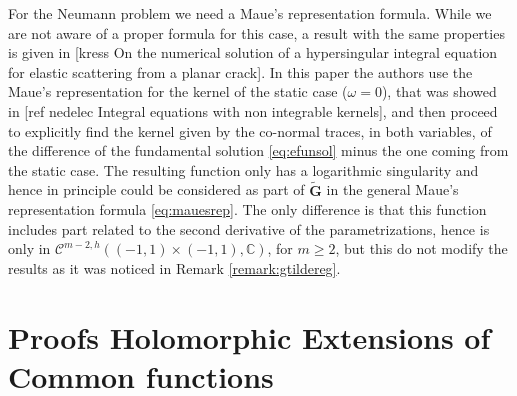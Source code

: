 \documentclass{article}
\newcommand{\todo}[1]{{\color{red}[#1]}}
\newcommand{\IC}{{\mathbb C}}
\newcommand{\cmspaceh}[4]{\mathcal{C}^{#1,#2} \left( #3, #4 \right)}
\newcommand{\iinterv}{(-1,1)\times(-1,1)}
\begin{document}
For the Neumann problem we need a Maue's representation formula. While we are not aware of a proper formula for this case, a result with the same properties is given in \todo{kress On the numerical solution of a hypersingular integral equation for elastic scattering from a planar crack}. In this paper the authors use the Maue's representation for the kernel of the static case ($\omega = 0$), that was showed in \todo{ref nedelec Integral equations with non integrable kernels}, and then proceed to explicitly find the kernel given by the co-normal traces, in both variables, of the difference of the fundamental solution \eqref{eq:efunsol}  minus the one coming from the static case. The resulting function only has a logarithmic singularity and hence in principle could be considered as part of $\widetilde{\mathbf{G}}$ in the general Maue's representation formula \eqref{eq:mauesrep}. The only difference is that this function includes part related to the second derivative of the parametrizations, hence is only in $\cmspaceh{m-2}{h}{\iinterv}{\IC}$, for $m\geq 2$, but this do not modify the results as it was noticed in Remark \ref{remark:gtildereg}. 




\appendix
\section{Proofs Holomorphic Extensions of Common functions }
\label{appendix:funext}
\end{document}

